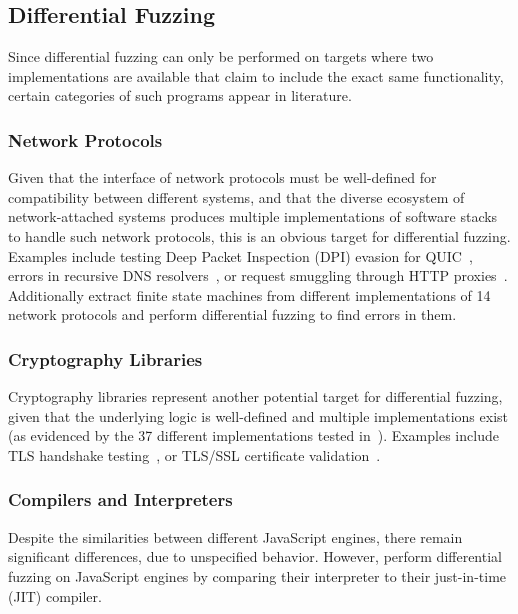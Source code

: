 \documentclass{article}
\let\savedCite=\cite
\renewcommand{\cite}{\unskip~\savedCite}
\begin{document}
\begin{multicols}{2}
    \subsection{Differential Fuzzing}

    Since differential fuzzing can only be performed on targets where two implementations are available that claim to include the exact same functionality, certain categories of such programs appear in literature.

    \subsubsection{Network Protocols}

    Given that the interface of network protocols must be well-defined for compatibility between different systems, and that the diverse ecosystem of network-attached systems produces multiple implementations of software stacks to handle such network protocols, this is an obvious target for differential fuzzing. Examples include testing Deep Packet Inspection (DPI) evasion for QUIC\cite{DPIFuzz}, errors in recursive DNS resolvers\cite{ResolFuzz}, or request smuggling through HTTP proxies\cite{T-Reqs}. Additionally \citeauthor{ParDiff} extract finite state machines from different implementations of 14 network protocols and perform differential fuzzing to find errors in them.\cite{ParDiff}

    \subsubsection{Cryptography Libraries}

    Cryptography libraries represent another potential target for differential fuzzing, given that the underlying logic is well-defined and multiple implementations exist (as evidenced by the 37 different implementations tested in\cite{TLS}). Examples include TLS handshake testing\cite{ExploitingDissent, TLS}, or TLS/SSL certificate validation\cite{NEZHA}.

    \subsubsection{Compilers and Interpreters}

    Despite the similarities between different JavaScript engines, there remain significant differences, due to unspecified behavior. However, \citeauthor{JIT-Picking} perform differential fuzzing on JavaScript engines by comparing their interpreter to their just-in-time (JIT) compiler.\cite{JIT-Picking}


\end{multicols}
\end{document}
